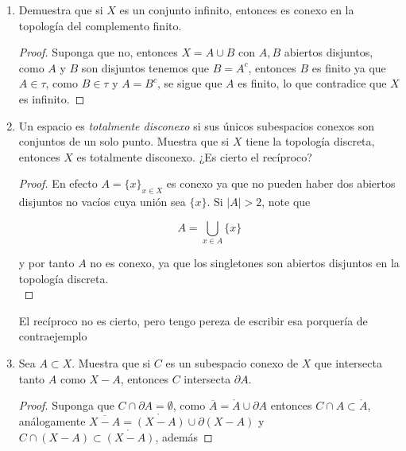 \documentclass[11pt]{article}
\begin{document}
\begin{enumerate}
    \begin{proof}
        Note que $$A\cup \bigcup_{\alpha}A_{\alpha}=\bigcup_{\alpha}(A\cup A_{\alpha})$$

        y como $A\subset \displaystyle \bigcap_{\alpha}(A\cup A_{\alpha}) 
            $, y $A\neq \emptyset$, entonces por el punto anterior se concluye lo deseado.
    \end{proof}
    
    \item Demuestra que si $X$ es un conjunto infinito, entonces es conexo en la topología del complemento finito.

    \begin{proof}
        Suponga que no, entonces $X=A\cup B$ con $A,B$ abiertos disjuntos, como $A$ y $B$ son disjuntos tenemos que $B=A^{c}$, entonces $B$ es finito ya que $A\in \tau$, como $B\in \tau$ y $A=B^{c}$, se sigue que $A$ es finito, lo que contradice que $X$ es infinito.
    \end{proof}
    
    \item Un espacio es \textit{totalmente disconexo} si sus únicos subespacios conexos son conjuntos de un solo punto. Muestra que si $X$ tiene la topología discreta, entonces $X$ es totalmente disconexo. ¿Es cierto el recíproco?

    \begin{proof}
        En efecto $A=\{x\}_{x\in X}$ es conexo ya que no pueden haber dos abiertos disjuntos no vacíos cuya unión sea $\{x\}$. Si $|A|>2$, note que 

        $$A=\bigcup_{x\in A}\{x\}
            $$

        y por tanto $A$ no es conexo, ya que los singletones son abiertos disjuntos en la topología discreta.\\
    \end{proof}
    
    El recíproco no es cierto, pero tengo pereza de escribir esa porquería de contraejemplo 

    \item Sea $A \subset X$. Muestra que si $C$ es un subespacio conexo de $X$ que intersecta tanto $A$ como $X - A$, entonces $C$ intersecta $\partial A$.

    \begin{proof}
        Suponga que $C\cap \partial A=\emptyset$, como $\overline{A}=\mathring{A}\cup \partial A$ entonces $C\cap A\subset \mathring{A}$, análogamente $\overline{X-A}=\mathring{(X-A)}\cup \partial (X-A)$  y $C\cap (X-A)\subset \mathring{(X-A)}$, además


\end{proof}
\end{enumerate}
\end{document}
